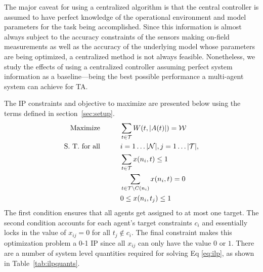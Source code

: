 \documentclass[defaultstyle,12pt]{thesis}
\newcommand{\Pl}{\mathcal{N}} %
\newcommand{\Ta}{\mathcal{T}} %
\newcommand{\We}{\mathcal{W}} %
\begin{document}
The major caveat for using a centralized algorithm is that the central controller is assumed to have perfect knowledge of the operational environment and model parameters for the task being accomplished. Since this information is almost always subject to the accuracy constraints of the sensors making on-field measurements as well as the accuracy of the underlying model whose parameters are being optimized, a centralized method is not always feasible. Nonetheless, we study the effects of using a centralized controller assuming perfect system information as a baseline---being the best possible performance a multi-agent system can achieve for TA.

The IP constraints and objective to maximize are presented below using the terms defined in section~\ref{sec:setup}. 
\begin{align}\label{eq:ilp}
	\text{Maximize}\hspace{1cm} & \sum\limits_{t \in \Ta} W(t, |A(t)|) = \We\\
	\text{S. T. for all}\hspace{1cm} & i = 1\ldots|\Pl|, j = 1\ldots|\Ta|,\notag\\
	& \sum\limits_{t \in \Ta} x(n_i, t) \leq 1\notag\\
	& \sum\limits_{t \in \Ta \backslash C(n_i)} x(n_i, t) = 0\notag\\
	& 0 \leq x(n_i, t_j) \leq 1\notag
\end{align}
The first condition ensures that all agents get assigned to at most one target. The second condition accounts for each agent's target constraints $c_i$ and essentially locks in the value of $x_{ij} = 0$ for all $t_j \not\in c_i$. The final constraint makes this optimization problem a 0-1 IP since all $x_{ij}$ can only have the value $0$ or $1$. There are a number of system level quantities required for solving Eq \eqref{eq:ilp}, as shown in Table~\ref{tab:ilpquants}.
\end{document}
